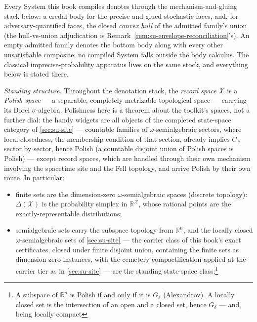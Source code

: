 Every System this book compiles denotes through the mechanism-and-gluing
stack below: a credal body for the precise and glued stochastic faces, and,
for adversary-quantified faces, the closed \emph{convex hull} of the admitted
family's union (the hull-vs-union adjudication is
Remark~\ref{rem:su-envelope-reconciliation}'s). An empty admitted family denotes the bottom body
along with every other unsatisfiable composite; no compiled System falls
outside the body calculus. The classical imprecise-probability apparatus
lives on the same stock, and everything below is stated there.

\begin{definition}
\label{def:su-credal-denotation}
\emph{Standing structure.} Throughout the denotation stack, the
\emph{record space} $\mathcal{X}$ is a \emph{Polish space} --- a
separable, completely metrizable topological space --- carrying its
Borel $\sigma$-algebra. Polishness here is a theorem about the
toolkit's spaces, not a further dial: the handy widgets are all
objects of the completed state-space category of
\autoref{sec:su-site} --- countable families of
$\omega$-semialgebraic sectors, where local closedness, the
membership condition of that section, already implies $G_\delta$
sector by sector, hence Polish (a countable disjoint union of
Polish spaces is Polish) --- except record spaces, which are
handled through
their own mechanism involving the spacetime site and the Fell
topology, and arrive Polish by their own route. In particular:
\begin{itemize}
\item finite sets are the dimension-zero $\omega$-semialgebraic
  spaces (discrete topology): $\Delta(\mathcal{X})$
  is the probability simplex in $\mathbb{R}^{\mathcal{X}}$, whose
  rational points are the exactly-representable distributions;
\item semialgebraic sets carry the subspace topology from
  $\mathbb{R}^n$, and the locally closed
  $\omega$-semialgebraic sets of \autoref{sec:su-site} --- the
  carrier class of this book's exact certificates, closed under
  finite disjoint union, containing
  the finite sets as dimension-zero instances, with the cemetery
  compactification applied at the carrier tier as in
  \autoref{sec:su-site} --- are the standing
  state-space class;\footnote{A subspace
  of $\mathbb{R}^n$ is Polish if and only if it is $G_\delta$
  (Alexandrov). A locally closed set is the intersection of an open
  and a closed set, hence $G_\delta$ --- and, being locally compact
}
\end{itemize}
\end{definition}
